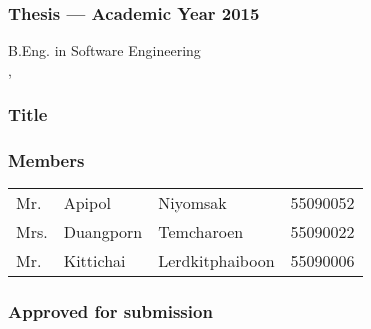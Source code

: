 \thispagestyle{empty}

\begin{flushleft}
\subsubsection{\Large{Thesis --- Academic Year 2015}}
B.Eng. in Software Engineering \\
\IC, \kmitl

\vspace{2cm}

\subsubsection{\Large{Title}}
\dms

\vspace{1cm}
\subsubsection{\Large{Members}}
\begin{tabular}{llll}
	Mr. & Apipol & Niyomsak & 55090052 \\
	Mrs. & Duangporn & Temcharoen & 55090022 \\
	Mr. & Kittichai & Lerdkitphaiboon & 55090006 \\
\end{tabular}
\end{flushleft}

\vfill

\begin{flushright}
\subsubsection{\Large{Approved for submission}}
\vspace{1cm}
\end{flushright}